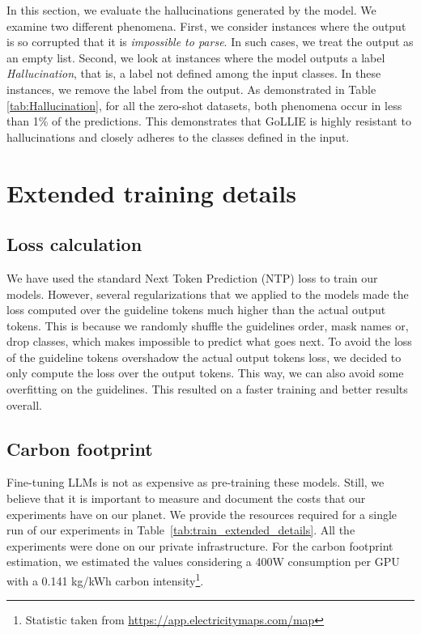 \documentclass{article} \usepackage{iclr2024_conference,times}
\begin{document}
In this section, we evaluate the hallucinations generated by the model. We examine two different phenomena. First, we consider instances where the output is so corrupted that it is \textit{impossible to parse}. In such cases, we treat the output as an empty list. Second, we look at instances where the model outputs a label \textit{Hallucination}, that is, a label not defined among the input classes. In these instances, we remove the label from the output. As demonstrated in Table \ref{tab:Hallucination}, for all the zero-shot datasets, both phenomena occur in less than 1\% of the predictions. This demonstrates that GoLLIE is highly resistant to hallucinations and closely adheres to the classes defined in the input.



\section{Extended training details}
\label{ap:extended_training_details}

\subsection{Loss calculation}

We have used the standard Next Token Prediction (NTP) loss to train our models. However, several regularizations that we applied to the models made the loss computed over the guideline tokens much higher than the actual output tokens. This is because we randomly shuffle the guidelines order, mask names or, drop classes, which makes impossible to predict what goes next. To avoid the loss of the guideline tokens overshadow the actual output tokens loss, we decided to only compute the loss over the output tokens. This way, we can also avoid some overfitting on the guidelines. This resulted on a faster training and better results overall.

\subsection{Carbon footprint}

Fine-tuning LLMs is not as expensive as pre-training these models. Still, we believe that it is important to measure and document the costs that our experiments have on our planet. We provide the resources required for a single run of our experiments in Table~\ref{tab:train_extended_details}. All the experiments were done on our private infrastructure. For the carbon footprint estimation, we estimated the values considering a 400W consumption per GPU with a 0.141 kg/kWh carbon intensity\footnote{Statistic taken from \url{https://app.electricitymaps.com/map}}.
\end{document}
